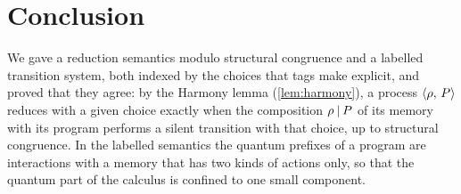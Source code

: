 \section{Conclusion}\label{sec:conclusion}

We gave \lqCCS a reduction semantics modulo structural congruence and a
labelled transition system, both indexed by the choices that tags make
explicit, and proved that they agree: by the Harmony lemma
(\cref{lem:harmony}), a process $\langle \rho ,\, P \rangle$ reduces with a given choice
exactly when the composition $\rho \mathbin{|} P$ of its memory with its program
performs a silent transition with that choice, up to structural congruence.
In the labelled semantics the quantum prefixes of a program are
interactions with a memory that has two kinds of actions only, so that the
quantum part of the calculus is confined to one small component.

